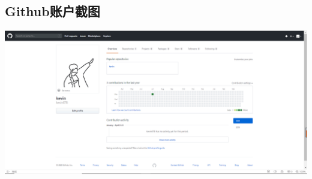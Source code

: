 \documentclass{article}
\begin{document}
\subsection{Github账户截图}
\begin{center}
	\includegraphics[scale=0.2]{github_account}
\end{center}
\end{document}
